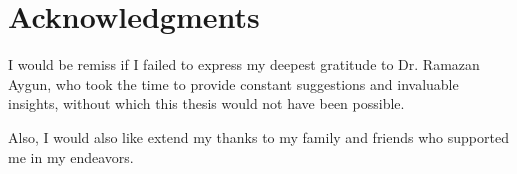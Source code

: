 \chapter*{Acknowledgments}

I would be remiss if I failed to express my deepest gratitude to Dr. Ramazan Aygun, who took the time to provide constant suggestions and invaluable insights, without which this thesis would not have been possible.

Also, I would also like extend my thanks to my family and friends who supported me in my endeavors.
